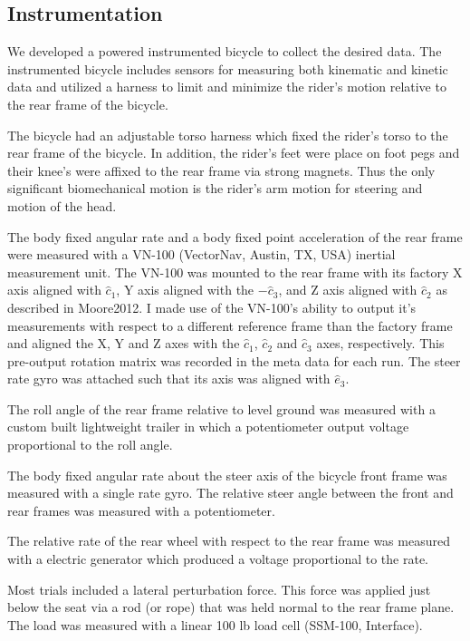 \documentclass{article}
\begin{document}
\subsection{Instrumentation}

We developed a powered instrumented bicycle to collect the desired data. The
instrumented bicycle includes sensors for measuring both kinematic and kinetic
data and utilized a harness to limit and minimize the rider's motion relative
to the rear frame of the bicycle.

The bicycle had an adjustable torso harness which fixed the rider's torso to
the rear frame of the bicycle. In addition, the rider's feet were place on foot
pegs and their knee's were affixed to the rear frame via strong magnets. Thus
the only significant biomechanical motion is the rider's arm motion for
steering and motion of the head.

The body fixed angular rate and a body fixed point acceleration of the rear
frame were measured with a VN-100 (VectorNav, Austin, TX, USA) inertial
measurement unit. The VN-100 was mounted to the rear frame with its factory X
axis aligned with $\hat{c}_1$, Y axis aligned with the $-\hat{c}_3$, and Z axis
aligned with $\hat{c}_2$ as described in Moore2012. I made use of the VN-100's
ability to output it's measurements with respect to a different reference frame
than the factory frame and aligned the X, Y and Z axes with the $\hat{c}_1$,
$\hat{c}_2$ and $\hat{c}_3$ axes, respectively.  This pre-output rotation
matrix was recorded in the meta data for each run. The steer rate gyro was
attached such that its axis was aligned with $\hat{e}_3$.


The roll angle of the rear frame relative to level ground was measured with a
custom built lightweight trailer in which a potentiometer output voltage
proportional to the roll angle.

The body fixed angular rate about the steer axis of the bicycle front frame was
measured with a single rate gyro. The relative steer angle between the front
and rear frames was measured with a potentiometer.

The relative rate of the rear wheel with respect to the rear frame was measured
with a electric generator which produced a voltage proportional to the rate.

Most trials included a lateral perturbation force. This force was applied just
below the seat via a rod (or rope) that was held normal to the rear frame
plane. The load was measured with a linear 100 lb load cell (SSM-100,
Interface).
\end{document}
